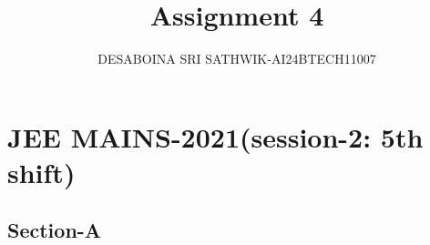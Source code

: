 \documentclass[journal,12pt,onecolumn]{IEEEtran}
\theoremstyle{remark}
\begin{document}

\vspace{3cm}

\title{Assignment 4}
\author{DESABOINA SRI SATHWIK-AI24BTECH11007}
\maketitle
\bigskip

\renewcommand{\thefigure}{\theenumi}
\renewcommand{\thetable}{\theenumi}
\section*{JEE MAINS-2021(session-2: 5th shift)}
\subsection*{Section-A}
\end{document}
